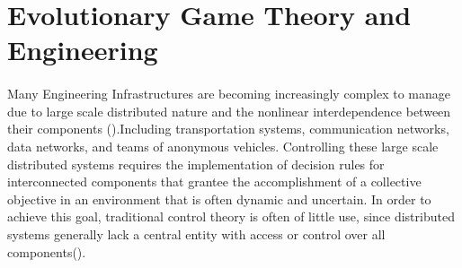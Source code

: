 \section{Evolutionary Game Theory and Engineering}
\paragraph{}Many Engineering Infrastructures are becoming increasingly complex to manage due to large scale distributed nature and the nonlinear interdependence between their components (\cite{Quijano et al, 2017}).Including transportation systems, communication networks, data networks, and teams of anonymous vehicles. Controlling these large scale distributed systems requires the implementation of decision rules for interconnected components that grantee the accomplishment of a collective objective in an environment that is often dynamic and uncertain. In order to achieve this goal, traditional control theory is often of little use, since distributed systems generally lack a central  entity with access or control over all components(\cite{Marden and Shamma, 2015}).